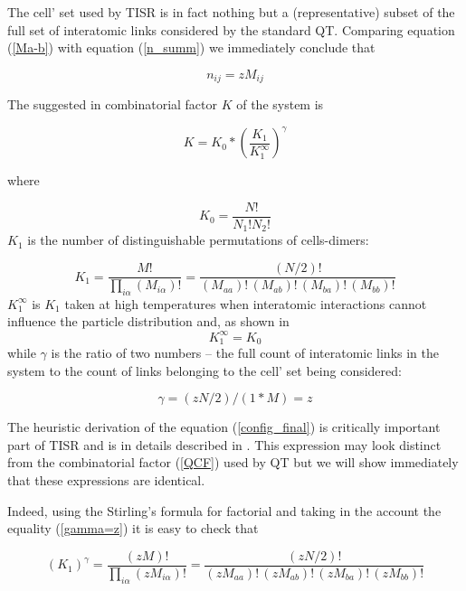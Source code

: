 \documentclass[12pt,abstract]{scrartcl}
\begin{document}
The cell' set used by TISR is in fact nothing but a (representative) subset of the full set  of interatomic links considered by the  standard QT. Comparing equation (\ref{Ma-b}) with equation (\ref{n_summ}) we immediately conclude that


\begin{equation} \label{proportion}
n_{ij} = z M_{ij}
\end{equation}




The suggested in  \cite{TISR_p1}  combinatorial  factor $K$ of the system  is

\begin{equation} \label{config_final}
K = K_0 * \left( \frac{K_1}{K_1^\infty} \right)^\gamma 
\end{equation}

where

\begin{equation}\label{ideal}
K_0 = \frac{N!}{N_1! N_2!}
\end{equation}
 $K_1$ is the number of distinguishable permutations of cells-dimers:

\begin{equation} \label{K1}
K_1 = \frac{M!}{\prod\limits_{i \alpha} ( M_{i \alpha})!} = \frac{(N/2)!}{(M_{aa})! \, (M_{ab})! \, (M_{ba})! \, (M_{bb})! }
\end{equation}
$K_1^\infty$ is $K_1$ taken at high temperatures when  interatomic interactions cannot influence the particle distribution and, as shown in  \cite{TISR_p1}
\[K_1^\infty = K_0\]
while $\gamma$ is the ratio of two numbers -- the full count of interatomic links in the system to the count of links belonging to the cell' set being considered:

\begin{equation} \label{gamma=z}
\gamma = (z N/2) / (1 * M) = z
\end{equation}

The heuristic derivation of the equation (\ref{config_final}) is critically important part of TISR and is in details described in \cite{TISR_p1}. This expression may look distinct from the  combinatorial  factor (\ref{QCF}) used by QT but we will show immediately that these expressions are identical.

Indeed, using the Stirling's formula for factorial \cite{Arfken2013} and taking in the account the equality  (\ref{gamma=z}) it is easy  to check that

\begin{equation}
(K_1)^\gamma =  \frac {(zM)!}{\prod\limits_{i \alpha} ( zM_{i \alpha})!} = \frac{(zN/2)!}{(zM_{aa})! \, (zM_{ab})! \, (zM_{ba})! \, (zM_{bb})! } 
\end{equation}
\end{document}
